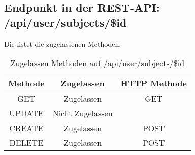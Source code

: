 \subsection{Endpunkt in der REST-API: /api/user/subjects/\$id}
Die  listet die zugelassenen Methoden. 

\begin{table}[!htbp]
	\begin{tabular}{|c|c|c|}
		\hline
			\textbf{Methode} & \textbf{Zugelassen} & \textbf{HTTP Methode} \\ \hline
			GET & Zugelassen & GET \\ \hline
			UPDATE & Nicht Zugelassen & \\ \hline 
			CREATE & Zugelassen & POST \\ \hline 
			DELETE & Zugelassen & POST \\ \hline
	\end{tabular}

		\caption{Zugelassen Methoden auf /api/user/subjects/\$id}
		\label{tab:end:rest:api:user:subjects:id:meth}
\end{table}